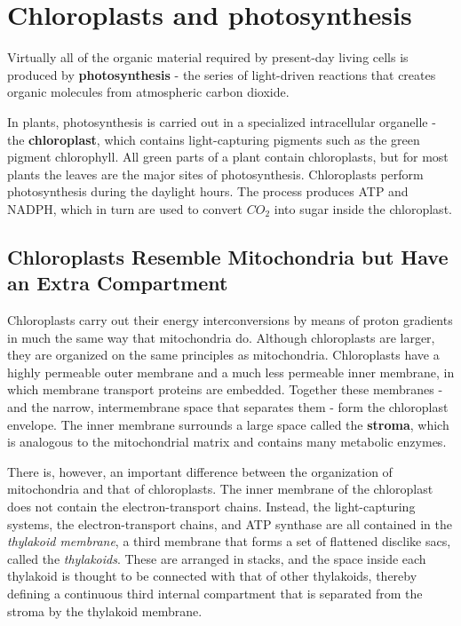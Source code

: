 \section{Chloroplasts and photosynthesis}

Virtually all of the organic material required by present-day living cells
is produced by \textbf{photosynthesis} - the series of light-driven reactions
that creates organic molecules from atmospheric carbon dioxide.

In plants, photosynthesis is carried out in a specialized intracellular
organelle - the \textbf{chloroplast}, which contains light-capturing pigments
such as the green pigment chlorophyll. All green parts of a plant contain
chloroplasts, but for most plants the leaves are the major sites of photosynthesis.
Chloroplasts perform photosynthesis during the daylight hours.
The process produces ATP and NADPH, which in turn are used to convert
$CO_2$ into sugar inside the chloroplast.

\subsection{Chloroplasts Resemble Mitochondria but Have an Extra Compartment}

Chloroplasts carry out their energy interconversions by means of proton
gradients in much the same way that mitochondria do. Although
chloroplasts are larger, they are organized on the same
principles as mitochondria. Chloroplasts have a highly permeable outer
membrane and a much less permeable inner membrane, in which membrane
transport proteins are embedded. Together these membranes - and
the narrow, intermembrane space that separates them - form the chloroplast
envelope. The inner membrane surrounds a large
space called the \textbf{stroma}, which is analogous to the mitochondrial matrix
and contains many metabolic enzymes.

There is, however, an important difference between the organization
of mitochondria and that of chloroplasts. The inner membrane of the
chloroplast does not contain the electron-transport chains. Instead, the
light-capturing systems, the electron-transport chains, and ATP synthase
are all contained in the \textit{thylakoid membrane}, a third membrane that forms
a set of flattened disclike sacs, called the \textit{thylakoids}. These
are arranged in stacks, and the space inside each thylakoid is thought to
be connected with that of other thylakoids, thereby defining a continuous
third internal compartment that is separated from the stroma by the
thylakoid membrane.

